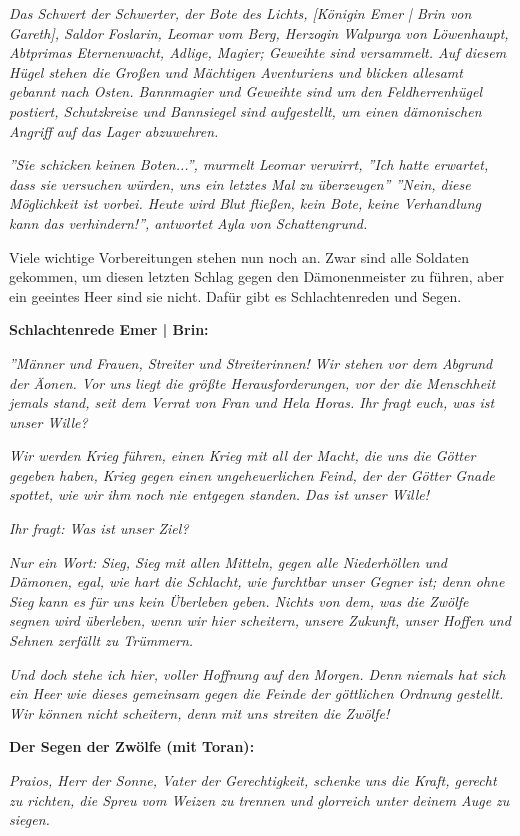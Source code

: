 \emph{Das Schwert der Schwerter, der Bote des Lichts, [Königin Emer | Brin von Gareth], Saldor Foslarin, Leomar vom Berg, Herzogin Walpurga von Löwenhaupt, Abtprimas Eternenwacht, Adlige, Magier; Geweihte sind versammelt. Auf diesem Hügel stehen die Großen und Mächtigen Aventuriens und blicken allesamt gebannt nach Osten. Bannmagier und Geweihte sind um den Feldherrenhügel postiert, Schutzkreise und Bannsiegel sind aufgestellt, um einen dämonischen Angriff auf das Lager abzuwehren.}

\emph{''Sie schicken keinen Boten...'', murmelt Leomar verwirrt, ''Ich hatte erwartet, dass sie versuchen würden, uns ein letztes Mal zu überzeugen'' ''Nein, diese Möglichkeit ist vorbei. Heute wird Blut fließen, kein Bote, keine Verhandlung kann das verhindern!'', antwortet Ayla von Schattengrund.}

Viele wichtige Vorbereitungen stehen nun noch an. Zwar sind alle Soldaten gekommen, um diesen letzten Schlag gegen den Dämonenmeister zu führen, aber ein geeintes Heer sind sie nicht. Dafür gibt es Schlachtenreden und Segen. 

\textbf{Schlachtenrede Emer | Brin:}

\emph{''Männer und Frauen, Streiter und Streiterinnen! Wir stehen vor dem Abgrund der Äonen. Vor uns liegt die größte Herausforderungen, vor der die Menschheit jemals stand, seit dem Verrat von Fran und Hela Horas. Ihr fragt euch, was ist unser Wille?}

\emph{Wir werden Krieg führen, einen Krieg mit all der Macht, die uns die Götter gegeben haben, Krieg gegen einen ungeheuerlichen Feind, der der Götter Gnade spottet, wie wir ihm noch nie entgegen standen. Das ist unser Wille!}

\emph{Ihr fragt: Was ist unser Ziel?}

\emph{Nur ein Wort: Sieg, Sieg mit allen Mitteln, gegen alle Niederhöllen und Dämonen, egal, wie hart die Schlacht, wie furchtbar unser Gegner ist; denn ohne Sieg kann es für uns kein Überleben geben. Nichts von dem, was die Zwölfe segnen wird überleben, wenn wir hier scheitern, unsere Zukunft, unser Hoffen und Sehnen zerfällt zu Trümmern.}

\emph{Und doch stehe ich hier, voller Hoffnung auf den Morgen. Denn niemals hat sich ein Heer wie dieses gemeinsam gegen die Feinde der göttlichen Ordnung gestellt. Wir können nicht scheitern, denn mit uns streiten die Zwölfe!}

\textbf{Der Segen der Zwölfe (mit Toran):}

\emph{Praios, Herr der Sonne, Vater der Gerechtigkeit, schenke uns die Kraft, gerecht zu richten, die Spreu vom Weizen zu trennen und glorreich unter deinem Auge zu siegen.}

